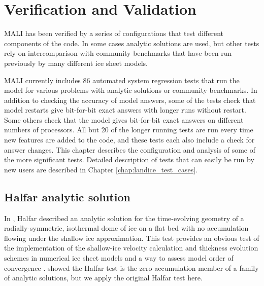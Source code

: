 \chapter{Verification and Validation}
\label{chap:landice-vv}


MALI has been verified by a series of configurations that test different components of the code.
In some cases analytic solutions are used, but other tests rely on intercomparison with community benchmarks
that have been run previously by many different ice sheet models.

MALI currently includes 86 automated system regression tests that run the model for various
problems with analytic solutions or community benchmarks.
In addition to checking the accuracy of model answers,
some of the tests check that model restarts give bit-for-bit 
exact answers with longer runs without restart.
Some others check that the model gives bit-for-bit 
exact answers on different numbers of processors.
All but 20 of the longer running tests are run every time new features are added to the code,
and these tests each also include a check for answer changes.
This chapter describes the configuration and analysis of some of the more
significant tests.
Detailed description of tests that can easily be run by new users are described
in Chapter \ref{chap:landice_test_cases}.

\section{Halfar analytic solution}
In \citep{Halfar1981,Halfar1983}, Halfar
described an analytic solution for the time-evolving geometry of a radially-symmetric, isothermal dome of ice 
on a flat bed with no accumulation flowing under the shallow ice approximation.
This test provides an obvious test of the implementation of the shallow-ice velocity calculation and thickness evolution schemes
in numerical ice sheet models and a way to assess model order of convergence \citep{bueler2005,egholm2010}.
\citet{bueler2005} showed the Halfar test is the zero accumulation member of a family of analytic solutions,
but we apply the original Halfar test here.

